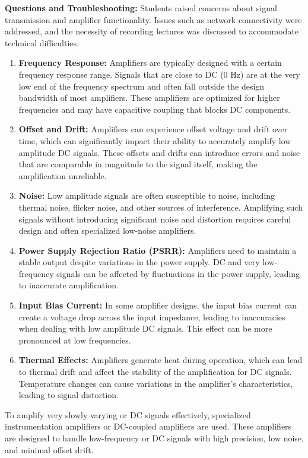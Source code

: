 \documentclass[a4paper,9pt,twoside,openany,twocolumn]{memoir}
\begin{document}
\textbf{Questions and Troubleshooting:} Students raised concerns about signal transmission and amplifier functionality. Issues such as network connectivity were addressed, and the necessity of recording lectures was discussed to accommodate technical difficulties.


\begin{tcolorbox}[colframe=orange!50!black, colback=white, coltitle=white, title={Why are most amplifiers unable to effectively amplify very slowly varying, low-amplitude signals, which can largely be considered D.C.?}]
   

\begin{enumerate}
    \item \textbf{Frequency Response:} Amplifiers are typically designed with a certain frequency response range. Signals that are close to DC (0 Hz) are at the very low end of the frequency spectrum and often fall outside the design bandwidth of most amplifiers. These amplifiers are optimized for higher frequencies and may have capacitive coupling that blocks DC components.
    
    \item \textbf{Offset and Drift:} Amplifiers can experience offset voltage and drift over time, which can significantly impact their ability to accurately amplify low amplitude DC signals. These offsets and drifts can introduce errors and noise that are comparable in magnitude to the signal itself, making the amplification unreliable.
    
    \item \textbf{Noise:} Low amplitude signals are often susceptible to noise, including thermal noise, flicker noise, and other sources of interference. Amplifying such signals without introducing significant noise and distortion requires careful design and often specialized low-noise amplifiers.
    
    \item \textbf{Power Supply Rejection Ratio (PSRR):} Amplifiers need to maintain a stable output despite variations in the power supply. DC and very low-frequency signals can be affected by fluctuations in the power supply, leading to inaccurate amplification.
    
    \item \textbf{Input Bias Current:} In some amplifier designs, the input bias current can create a voltage drop across the input impedance, leading to inaccuracies when dealing with low amplitude DC signals. This effect can be more pronounced at low frequencies.
    
    \item \textbf{Thermal Effects:} Amplifiers generate heat during operation, which can lead to thermal drift and affect the stability of the amplification for DC signals. Temperature changes can cause variations in the amplifier's characteristics, leading to signal distortion.
\end{enumerate}

To amplify very slowly varying or DC signals effectively, specialized instrumentation amplifiers or DC-coupled amplifiers are used. These amplifiers are designed to handle low-frequency or DC signals with high precision, low noise, and minimal offset drift.
\end{tcolorbox}
\end{document}
